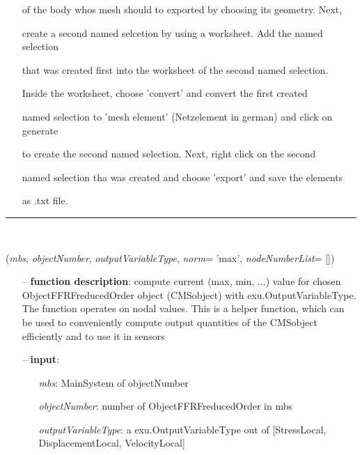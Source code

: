 \begin{itemize}[leftmargin=1.4cm]
\begin{itemize}[leftmargin=1.4cm]
\begin{itemize}[leftmargin=1.4cm]
\begin{itemize}[leftmargin=0.5cm]
\begin{itemize}[leftmargin=1.4cm]
\begin{itemize}[leftmargin=1.4cm]
\begin{itemize}[leftmargin=0.5cm]
\begin{itemize}[leftmargin=0.7cm]
\begin{itemize}[leftmargin=1.2cm]
\item[]of the body whos mesh should to exported by choosing its geometry. Next,
\item[]create a second named selcetion by using a worksheet. Add the named selection
\item[]that was created first into the worksheet of the second named selection.
\item[]Inside the worksheet, choose 'convert' and convert the first created
\item[]named selection to 'mesh element' (Netzelement in german) and click on generate
\item[]to create the second named selection. Next, right click on the second
\item[]named selection tha was created and choose 'export' and save the elements
\item[]as .txt file.
\end{itemize}
\vspace{12pt}\end{itemize}
%
\noindent\rule{8cm}{0.75pt}\vspace{1pt} \\ 
\begin{flushleft}
\label{sec:FEM:CMSObjectComputeNorm}
({\it mbs}, {\it objectNumber}, {\it outputVariableType}, {\it norm}= 'max', {\it nodeNumberList}= [])
\end{flushleft}
\setlength{\itemindent}{0.7cm}
\begin{itemize}[leftmargin=0.7cm]
\item[--]
{\bf function description}: compute current (max, min, ...) value for chosen ObjectFFRFreducedOrder object (CMSobject) with exu.OutputVariableType. The function operates on nodal values. This is a helper function, which can be used to conveniently compute output quantities of the CMSobject efficiently and to use it in sensors
\item[--]
{\bf input}: \vspace{-6pt}
\begin{itemize}[leftmargin=1.2cm]
\setlength{\itemindent}{-0.7cm}
\item[]{\it mbs}: MainSystem of objectNumber
\item[]{\it objectNumber}: number of ObjectFFRFreducedOrder in mbs
\item[]{\it outputVariableType}: a exu.OutputVariableType out of [StressLocal, DisplacementLocal, VelocityLocal]

\end{itemize}
\end{itemize}
\end{itemize}
\end{itemize}
\end{itemize}
\end{itemize}
\end{itemize}
\end{itemize}
\end{itemize}
